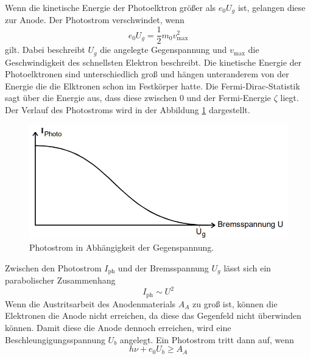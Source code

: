 Wenn die kinetische Energie der Photoelktron größer als $e_0U_g$ ist, gelangen diese zur Anode.
Der Photostrom verschwindet, wenn 
\begin{equation}
    e_0 U_g = \frac{1}{2}m_0 v_\text{max}^2
\end{equation}
gilt.
Dabei beschreibt $U_g$ die angelegte Gegenspannung und $v_\text{max}$ die Geschwindigkeit des schnellsten Elektron beschreibt.
Die kinetische Energie der Photoelktronen sind unterschiedlich groß und hängen unteranderem von der Energie die die Elktronen schon im Festkörper hatte.
Die Fermi-Dirac-Statistik sagt über die Energie aus, dass diese zwischen 0 und der Fermi-Energie $\zeta$ liegt.
Der Verlauf des Photostroms wird in der Abbildung \ref{fig:verlauf} dargestellt.
\begin{figure}
    \centering
    \includegraphics[scale=0.5]{content/VerlaufIU.png}
    \caption{Photostrom in Abhängigkeit der Gegenspannung.\cite{sample}}
    \label{fig:verlauf}
\end{figure}
Zwischen den Photostrom $I_\text{ph}$ und der Bremsspannung $U_g$ lässt sich ein parabolischer Zusammenhang
\begin{equation*}
    I_\text{ph} \sim U^2
\end{equation*}
Wenn die Austritsarbeit des Anodenmaterials $A_A$ zu groß ist, können die Elektronen die Anode nicht erreichen, da
diese das Gegenfeld nicht überwinden können.
Damit diese die Anode dennoch erreichen, wird eine Beschleungigungsspannung $U_b$ angelegt.
Ein Photostrom tritt dann auf, wenn
\begin{equation}
    h \nu + e_0 U_b \geq A_A
\end{equation}  
\cite{sample}
